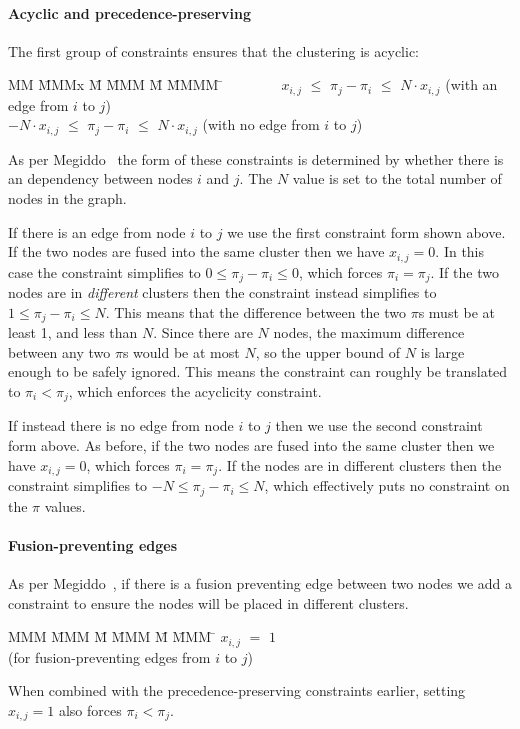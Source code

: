 \paragraph{Acyclic and precedence-preserving} The first group of constraints ensures that the clustering is acyclic:
\begin{tabbing}
MM  \= MMMx \= M \= MMM \= M \= MMMM \= \kill
    \> ~~~~~~~ $x_{i,j}$ \> $\le$ \> $\pi_j - \pi_i$ \> $\le$ \> $N \cdot x_{i,j}$ 
    \>             (with an edge from $i$ to $j$)            \\
    \> $-N \cdot  x_{i,j}$  \> $\le$ \> $\pi_j - \pi_i$ \> $\le$ \> $N \cdot x_{i,j}$ 
    \>             (with no edge from $i$ to $j$)
\end{tabbing}
As per Megiddo~\cite{megiddo1998optimal} the form of these constraints is determined by whether there is an dependency between nodes $i$ and $j$. The $N$ value is set to the total number of nodes in the graph.

If there is an edge from node $i$ to $j$ we use the first constraint form shown above. If the two nodes are fused into the same cluster then we have $x_{i,j} = 0$. In this case the constraint simplifies to $0 \le \pi_j - \pi_i \le 0$, which forces $\pi_i = \pi_j$. If the two nodes are in \emph{different} clusters then the constraint instead simplifies to $1 \le \pi_j - \pi_i \le N$. This means that the difference between the two $\pi$s must be at least 1, and less than $N$. Since there are $N$ nodes, the maximum difference between any two $\pi$s would be at most $N$, so the upper bound of $N$ is large enough to be safely ignored. This means the constraint can roughly be translated to $\pi_i < \pi_j$, which enforces the acyclicity constraint.

If instead there is no edge from node $i$ to $j$ then we use the second constraint form above. As before, if the two nodes are fused into the same cluster then we have $x_{i,j} = 0$, which forces $\pi_i = \pi_j$. If the nodes are in different clusters then the constraint simplifies to $-N \le \pi_j - \pi_i \le N$, which effectively puts no constraint on the $\pi$ values.


\paragraph{Fusion-preventing edges} As per Megiddo~\cite{megiddo1998optimal}, if there is a fusion preventing edge between two nodes we add a constraint to ensure the nodes will be placed in different clusters.
\begin{tabbing}
MMM     \= MMM \= M  \= MMM \= M \= MMM \= \kill
        \> $x_{i,j}$ \> $=$ \> $1$ \>   \> \\
        \> (for fusion-preventing edges from $i$ to $j$) 
\end{tabbing}
When combined with the precedence-preserving constraints earlier, setting $x_{i,j} = 1$ also forces $\pi_i < \pi_j$. 


